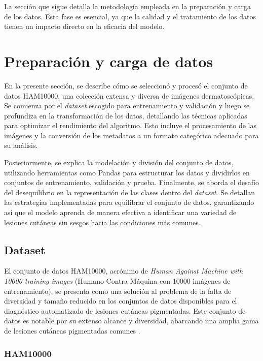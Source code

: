 La sección que sigue detalla la metodología empleada en la preparación y carga de los datos. Esta fase es esencial, ya que la calidad y el tratamiento de los datos tienen un impacto directo en la eficacia del modelo.

\section{Preparación y carga de datos}

En la presente sección, se describe cómo se seleccionó y procesó el conjunto de datos HAM10000, una colección extensa y diversa de imágenes dermatoscópicas. Se comienza por el \textit{dataset} escogido para entrenamiento y validación y luego se profundiza en la transformación de los datos, detallando las técnicas aplicadas para optimizar el rendimiento del algoritmo. Esto incluye el procesamiento de las imágenes y la conversión de los metadatos a un formato categórico adecuado para su análisis.

Posteriormente, se explica la modelación y división del conjunto de datos, utilizando herramientas como Pandas para estructurar los datos y dividirlos en conjuntos de entrenamiento, validación y prueba. Finalmente, se aborda el desafío del desequilibrio en la representación de las clases dentro del \textit{dataset}. Se detallan las estrategias implementadas para equilibrar el conjunto de datos, garantizando así que el modelo aprenda de manera efectiva a identificar una variedad de lesiones cutáneas sin sesgos hacia las condiciones más comunes.

\subsection{Dataset}

El conjunto de datos HAM10000, acrónimo de \textit{Human Against Machine with 10000 training images} (Humano Contra Máquina con 10000 imágenes de entrenamiento), se presenta como una solución al problema de la falta de diversidad y tamaño reducido en los conjuntos de datos disponibles para el diagnóstico automatizado de lesiones cutáneas pigmentadas. Este conjunto de datos es notable por su extenso alcance y diversidad, abarcando una amplia gama de lesiones cutáneas pigmentadas comunes . 

\subsubsection*{HAM10000}

